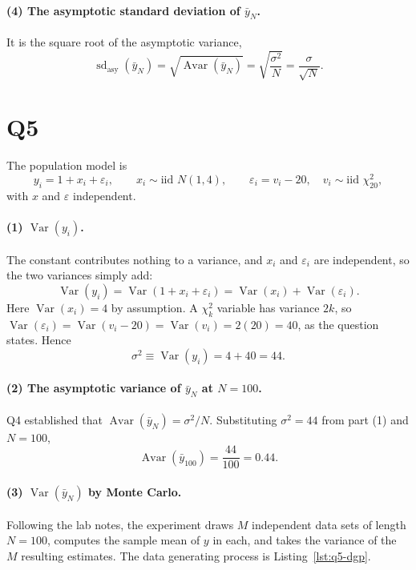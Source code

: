 \documentclass[11pt]{article}
\DeclareMathOperator{\Var}{Var}
\DeclareMathOperator{\Avar}{Avar}
\DeclareMathOperator{\sd}{sd}
\begin{document}
\paragraph{(4) The asymptotic standard deviation of $\bar{y}_N$.}
It is the square root of the asymptotic variance,
\[
\sd_{\text{asy}}(\bar{y}_N) = \sqrt{\Avar(\bar{y}_N)}
= \sqrt{\frac{\sigma^2}{N}} = \frac{\sigma}{\sqrt{N}} .
\]

\section{Q5}
\label{sec:q5}

The population model is
\[
y_i = 1 + x_i + \varepsilon_i,
\qquad
x_i \sim \text{iid } N(1,4),
\qquad
\varepsilon_i = v_i - 20,
\quad
v_i \sim \text{iid } \chi^2_{20},
\]
with $x$ and $\varepsilon$ independent. 

\paragraph{(1) $\Var(y_i)$.}
The constant contributes nothing to a variance, and $x_i$ and $\varepsilon_i$
are independent, so the two variances simply add:
\[
\Var(y_i) = \Var(1 + x_i + \varepsilon_i) = \Var(x_i) + \Var(\varepsilon_i).
\]
Here $\Var(x_i) = 4$ by assumption. A $\chi^2_k$
variable has variance $2k$, so
$\Var(\varepsilon_i) = \Var(v_i - 20) = \Var(v_i) = 2(20) = 40$, as the
question states. Hence
\[
\sigma^2 \equiv \Var(y_i) = 4 + 40 = 44 .
\]

\paragraph{(2) The asymptotic variance of $\bar{y}_N$ at $N = 100$.}
Q4 established that $\Avar(\bar{y}_N) = \sigma^2/N$. Substituting
$\sigma^2 = 44$ from part (1) and $N = 100$,
\[
\Avar(\bar{y}_{100}) = \frac{44}{100} = 0.44 .
\]

\paragraph{(3) $\Var(\bar{y}_N)$ by Monte Carlo.}
Following the lab notes, the experiment draws $M$ independent data sets of
length $N = 100$, computes the sample mean of $y$ in each, and takes the
variance of the $M$ resulting estimates. The data generating process is
Listing~\ref{lst:q5-dgp}.
\end{document}
